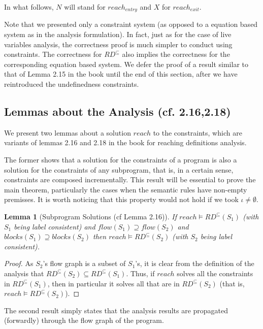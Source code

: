 \documentclass[a4wide,12pt]{article}
\theoremstyle{definition}
\theoremstyle{plain}
\newtheorem{lemma}[theo]{Lemma}
\theoremstyle{remark}
\begin{document}
In what follows, $N$ will stand for $reach_{entry}$ and $X$ for $reach_{exit}$. 


Note that we presented only a constraint system (as opposed to a equation based system 
as in the analysis formulation). In fact, just as for the case of live variables analysis,
the correctness proof is much simpler to conduct using constraints.
The correctness for $RD^\subseteq$ also implies the correctness for the corresponding
equation based system. We defer the proof of a result similar to that of Lemma 2.15 in the book
until the end of this section, after we have reintroduced the undefinedness constraints.


\subsection*{Lemmas about the Analysis (cf. 2.16,2.18)}

We present two lemmas about a solution $reach$ to the constraints, which are variants
of lemmas 2.16 and 2.18 in the book for reaching definitions analysis.

The former 
shows that a solution for the constraints of a program is also a solution for the constraints of any
subprogram, that is, in a certain sense, constraints are composed incrementally.
This result will be essential to prove the main theorem, particularly the cases when
the semantic rules have non-empty premisses. 
It is worth noticing that this property would not hold if we took $\iota \neq \emptyset$.

\begin{lemma}[Subprogram Solutions (cf Lemma 2.16)]
\label{lemmasubp}
If $reach \models RD^\subseteq(S_1)$ (with $S_1$ being label consistent) and
$flow(S_1) \supseteq flow(S_2)$ and $blocks(S_1) \supseteq blocks(S_2)$ then
$reach \models RD^\subseteq(S_2)$ (with $S_2$ being label consistent).
\end{lemma}
\begin{proof}
As $S_2$'s flow graph is a subset of $S_1$'s, it is clear from the definition
of the analysis 
that $RD^{\subseteq}(S_2) \subseteq RD^{\subseteq}(S_1)$. Thus, if 
$reach$ solves all the constraints in $RD^\subseteq(S_1)$, then in particular it
solves all that are in $RD^\subseteq(S_2)$ (that is, $reach \models RD^\subseteq(S_2)$).
\end{proof}


The second result simply states that the analysis results are
propagated (forwardly) through the flow graph of the program.
\end{document}
